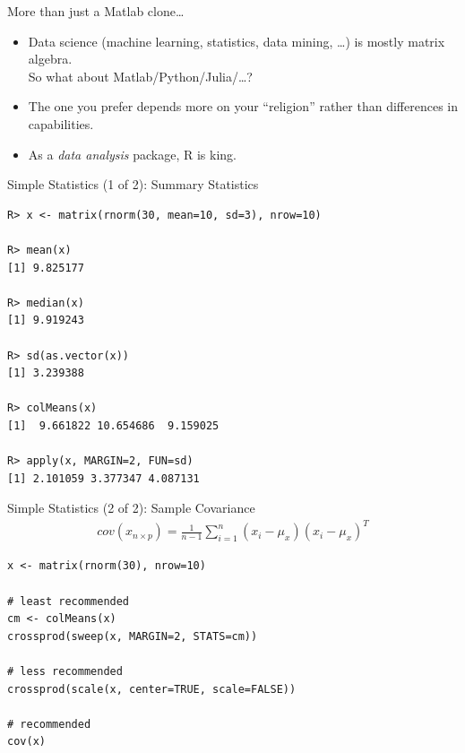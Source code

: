 \begin{frame}
  \begin{block}{More than just a Matlab clone\dots}\pause
  \begin{itemize}[<+-|alert@+>]
    \item Data science (machine learning, statistics, data mining, \dots) is 
mostly matrix algebra.  \\[.2cm]
     So what about Matlab/Python/Julia/\dots ?
    \item The one you prefer depends more on your ``religion'' rather than 
differences in capabilities.
    \item As a \emph{data analysis} package, R is king.
  \end{itemize}
\end{block}
\end{frame}


\begin{frame}[fragile]
  \begin{exampleblock}{Simple Statistics (1 of 2): Summary Statistics}\pause
  
\begin{lstlisting}[backgroundcolor=\color{white},basicstyle=\ttfamily\color{
dkgray}\scriptsize,keywordstyle=\color{black}, 
  commentstyle=\color{orange},stringstyle=\color{mauve}]
R> x <- matrix(rnorm(30, mean=10, sd=3), nrow=10)

R> mean(x)
[1] 9.825177

R> median(x)
[1] 9.919243

R> sd(as.vector(x))
[1] 3.239388

R> colMeans(x)
[1]  9.661822 10.654686  9.159025

R> apply(x, MARGIN=2, FUN=sd)
[1] 2.101059 3.377347 4.087131
\end{lstlisting}
  \end{exampleblock}
\end{frame}


\begin{frame}[fragile]
  \begin{exampleblock}{Simple Statistics (2 of 2): Sample Covariance}\pause
  \begin{align*}
    cov(x_{n\times p}) = 
\frac{1}{n-1}\sum_{i=1}^n\left(x_i-\mu_x\right)\left(x_i-\mu_x\right)^T
  \end{align*}
  \begin{lstlisting}
x <- matrix(rnorm(30), nrow=10)

# least recommended
cm <- colMeans(x)
crossprod(sweep(x, MARGIN=2, STATS=cm))

# less recommended
crossprod(scale(x, center=TRUE, scale=FALSE))

# recommended
cov(x)
\end{lstlisting}
  \end{exampleblock}
\end{frame}


